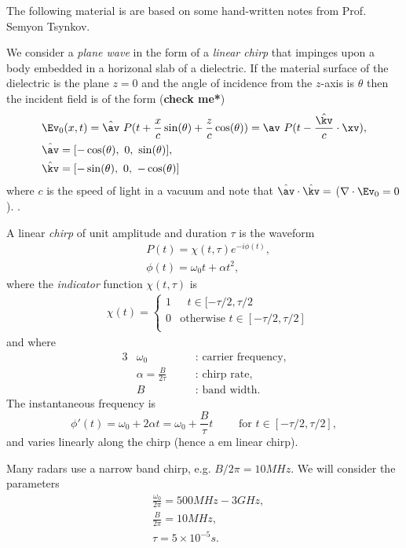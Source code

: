 \documentclass[11pt]{article}
\newcommand{\grad}{\nabla}
\begin{document}
The following material is are based on some hand-written notes from Prof. Semyon Tsynkov. 

We consider a {\em plane wave} in the form of a {\em linear chirp} that impinges upon
a body embedded in a horizonal slab of a dielectric. 
If the material surface of the dielectric is the plane $z=0$ and
the angle of incidence from the $z$-axis is $\theta$ then 
the incident field is of the form ({\bf *check me*})
\begin{align*}
  & \Ev_0(x,t) = \hat\av~ P( t + \frac{x}{c} \sin(\theta) + {\frac{z}c} \cos(\theta) ) = \av~P(t - \frac{\hat{\kv}}{c}\cdot\xv), \\
  & \hat\av = [-\cos(\theta),~ 0, ~ \sin(\theta) ], \\
  & \hat{\kv} = [-\sin(\theta),~ 0, ~ -\cos(\theta) ]
\end{align*}
where $c$ is the speed of light in a vacuum and note that $\hat\av \cdot \hat\kv=$ ($\grad\cdot\Ev_0=0$). .

A linear {\em chirp} of unit amplitude and duration $\tau$ is the waveform
\begin{align*}
    & P(t) = \chi(t,\tau) e^{-i \phi(t) } , \\
    & \phi(t) =\omega_0 t +  \alpha t^2, 
\end{align*}
where the {\em indicator} function $\chi(t,\tau)$ is 
\begin{align*}
    & \chi(t) = \begin{cases}
                      1 & \text{ $t\in[-\tau/2,\tau/2$} \\
                      0 & \text{otherwise $t\in[-\tau/2,\tau/2]$} \\
                \end{cases}
\end{align*}
and where 
\begin{alignat*}{3}
&    \omega_0 && \text{: carrier frequency}, \\
&    \alpha = \frac{B}{2\tau} \quad && \text{: chirp rate}, \\
&    B        && \text{: band width}.
\end{alignat*}
The instantaneous frequency is
\[
  \phi'(t) = \omega_0 + 2\alpha t = \omega_0 + \frac{B}{\tau} t \qquad \text{ for $t\in[-\tau/2,\tau/2]$},
\]
and varies linearly along the chirp (hence a {em linear chirp}). 

Many radars use a narrow band chirp, e.g. $B/2\pi = 10MHz$. We will consider the parameters
 \begin{align*}
    & \frac{\omega_0}{2\pi} = 500 MHz - 3 GHz, \\
    &  \frac{B}{2\pi} = 10 MHz, \\
    & \tau = 5 \times 10^{-5} s. 
\end{align*}
\end{document}
